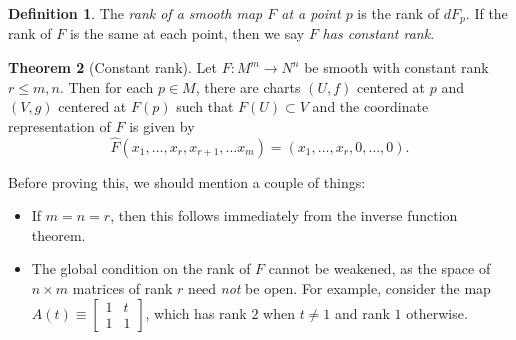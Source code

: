 \documentclass[10pt,letterpaper,cm]{nupset}
\theoremstyle{definition}
\newtheorem{definition}{Definition}[subsection]
\theoremstyle{theorem}
\newtheorem{theorem}[definition]{Theorem}
\theoremstyle{remark}
\newcommand{\1}{\mathbf{1}}
\newcommand{\0}{\vec 0}
\begin{document}
\begin{definition}
The \textit{rank of a smooth map $F$ at a point $p$} is the rank of $dF_p$. If the rank of $F$ is the same at each point, then we say $F$ \textit{has constant rank}.
\end{definition}

\begin{theorem}[Constant rank]
Let $F: M^m \to N^n$ be smooth with constant rank $r\leq m, n$. Then for each $p\in M$, there are charts $\left(U, f\right)$ centered at $p$ and $\left(V, g\right)$ centered at $F(p)$ such that $F(U) \subset V$ and the coordinate representation of $F$ is given by $$\widehat{F}(x_1, \ldots, x_r, x_{r+1}, \ldots x_m) = \left(x_1, \ldots, x_r, 0,\ldots, 0\right).$$
\end{theorem}

Before proving this, we should mention a couple of things:

\begin{itemize}
\item If $m=n =r$, then this follows immediately from the inverse function theorem. 
\item The global condition on the rank of $F$ cannot be weakened, as the space of $n\times m$ matrices of rank $r$ need \emph{not} be open. For example, consider the map $A(t) \equiv \begin{bmatrix} 1 & t \\ 1 & 1 \end{bmatrix}$, which has rank $2$ when $t\ne 1$ and rank $1$ otherwise.
\end{itemize}
\end{document}

